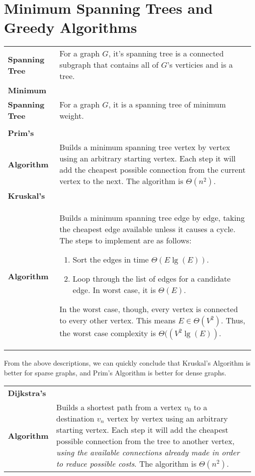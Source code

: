 \documentclass[aip, jmp, amsmath,amssymb, reprint]{revtex4-1}
\theoremstyle{definition}
\begin{document}
\section{Minimum Spanning Trees and Greedy Algorithms}
\begin{longtable}{p{2cm} p{5cm} }
    \textbf{Spanning Tree} & For a graph $G$, it's spanning tree is a connected subgraph that contains all of $G$'s verticies and is a tree.\\
    \textbf{Minimum}\\ \textbf{Spanning Tree} & For a graph $G$, it is a spanning tree of minimum weight.\\\\
    \textbf{Prim's}\\ \textbf{Algorithm} & Builds a minimum spanning tree vertex by vertex using an arbitrary starting vertex. Each step it will add the cheapest possible connection from the current vertex to the next. The algorithm is $\Theta(n^2)$.\\
    \textbf{Kruskal's}\\ \textbf{Algorithm} & \parbox[t]{5cm}{
    Builds a minimum spanning tree edge by edge, taking the cheapest edge available unless it causes a cycle. The steps to implement are as follows:
    \begin{enumerate}
        \item Sort the edges in time $\Theta(E \lg(E))$.
        \item Loop through the list of edges for a candidate edge. In worst case, it is $\Theta(E)$.
    \end{enumerate}
    In the worst case, though, every vertex is connected to every other vertex. This means $E \in \Theta(V^2)$. Thus, the worst case complexity is $\Theta((V^2 \lg(E))$.
    }
\end{longtable}
From the above descriptions, we can quickly conclude that Kruskal's Algorithm is better for sparse graphs, and Prim's Algorithm is better for dense graphs.
\newpage
\begin{longtable}{p{2cm} p{5cm} }
    \textbf{Dijkstra's}\\ \textbf{Algorithm} & \parbox[t]{5cm}{
    Builds a shortest path from a vertex $v_0$ to a destination $v_n$ vertex by vertex using an arbitrary starting vertex. Each step it will add the cheapest possible connection from the tree to another vertex, \textit{using the available connections already made in order to reduce possible costs}. The algorithm is $\Theta(n^2)$.
    }
\end{longtable}
\end{document}

